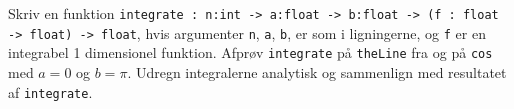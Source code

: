 Skriv en funktion \lstinline{integrate : n:int -> a:float -> b:float -> (f : float -> float) -> float}, hvis argumenter \lstinline{n}, \lstinline{a}, \lstinline{b}, er som i ligningerne, og \lstinline{f} er en integrabel 1 dimensionel funktion. Afprøv \lstinline{integrate} på \lstinline{theLine} fra  og på \lstinline{cos} med $a=0$ og $b=\pi$. Udregn integralerne analytisk og sammenlign med resultatet af \lstinline{integrate}.